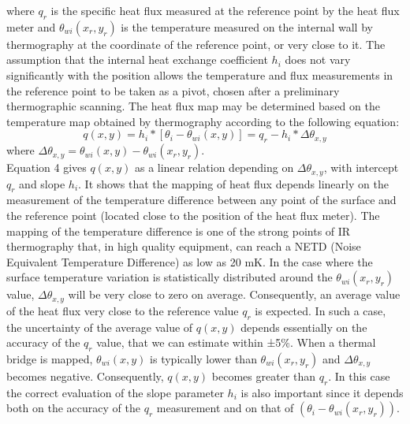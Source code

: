 \documentclass{tQRT2e}
\begin{document}
where $ q_r $ is the specific heat flux measured at the reference point by the heat flux meter and $ \theta_{wi}(x_r,y_r) $ is the temperature measured on the internal wall by thermography at the coordinate of the reference point, or very close to it. The assumption that the internal heat exchange coefficient $ h_i $ does not vary significantly with the position allows the temperature and flux measurements in the reference point to be taken as a pivot, chosen after a preliminary thermographic scanning. The heat flux map may be determined based on the temperature map obtained by thermography according to the following equation:
\begin{equation}
q(x,y)=h_i*[\theta_i-\theta_{wi} (x,y)]=q_r-h_i*\Delta \theta_{x,y}
\end{equation}
where $\Delta \theta_{x,y}=\theta_{wi} (x,y)- \theta_{wi} (x_r,y_r) $.\\
Equation 4 gives $ q(x,y) $ as a linear relation depending on  $ \Delta \theta_{x,y} $, with intercept $ q_r $ and slope $ h_i $. It shows that the mapping of heat flux depends linearly on the measurement of the temperature difference between any point of the surface and the reference point (located close to the position of the heat flux meter). The mapping of the temperature difference is one of the strong points of IR thermography that, in high quality equipment, can reach a NETD (Noise Equivalent Temperature Difference) as low as 20 mK. 
In the case where the surface temperature variation is statistically distributed around the $\theta_{wi} (x_r,y_r)$ value, $\Delta \theta_{x,y}$ will be very close to zero on average. Consequently, an average value of the heat  flux very close to the reference value $q_r$ is expected. In such a case, the uncertainty of the average value of $q(x, y)$ depends essentially on the accuracy of the $q_r$ value, that we can estimate within ±5\%. When a thermal bridge is mapped, $\theta_{wi} (x,y)$ is typically lower than $\theta_{wi} (x_r,y_r)$ and $\Delta \theta_{x,y}$ becomes negative. Consequently, $q(x,y)$ becomes greater than $q_r$. In this case the correct evaluation of the slope parameter $h_i$ is also important since it depends both on the accuracy of the $q_r$ measurement and on that of $(\theta_i - \theta_{wi}(x_r,y_r))$.
\end{document}
